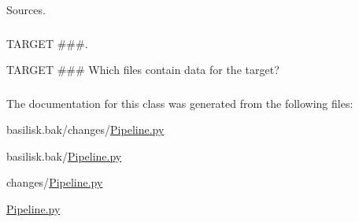 \-Sources. 

\hypertarget{class_pipeline_1_1_pipeline_ad7d97095bae6dca3e3daf6156440730c}{
\subsubsection[{\-Squash\-Factor}]{}}\label{class_pipeline_1_1_pipeline_ad7d97095bae6dca3e3daf6156440730c}
\hypertarget{class_pipeline_1_1_pipeline_a0be4f05b9f36d968de11c252c16d839b}{
\subsubsection[{\-Target\-Files}]{}}\label{class_pipeline_1_1_pipeline_a0be4f05b9f36d968de11c252c16d839b}


\-T\-A\-R\-G\-E\-T \#\#\#. 

\-T\-A\-R\-G\-E\-T \#\#\# \-Which files contain data for the target? \hypertarget{class_pipeline_1_1_pipeline_aebe89f9162b27a3104487970a3b4c0bd}{
\subsubsection[{\-Target\-Name}]{}}\label{class_pipeline_1_1_pipeline_aebe89f9162b27a3104487970a3b4c0bd}


\-The documentation for this class was generated from the following files\-:\begin{DoxyCompactItemize}
\item 
basilisk.\-bak/changes/\hyperlink{basilisk_8bak_2changes_2_pipeline_8py}{\-Pipeline.\-py}\item 
basilisk.\-bak/\hyperlink{basilisk_8bak_2_pipeline_8py}{\-Pipeline.\-py}\item 
changes/\hyperlink{changes_2_pipeline_8py}{\-Pipeline.\-py}\item 
\hyperlink{_pipeline_8py}{\-Pipeline.\-py}\end{DoxyCompactItemize}

